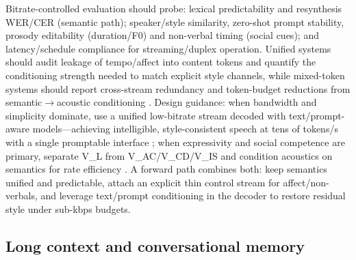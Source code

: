 \documentclass{article}
\begin{document}
Bitrate-controlled evaluation should probe: lexical predictability and resynthesis WER/CER (semantic path); speaker/style similarity, zero-shot prompt stability, prosody editability (duration/F0) and non-verbal timing (social cues); and latency/schedule compliance for streaming/duplex operation. Unified systems should audit leakage of tempo/affect into content tokens and quantify the conditioning strength needed to match explicit style channels, while mixed-token systems should report cross-stream redundancy and token-budget reductions from semantic$\rightarrow$acoustic conditioning \cite{yang2025diffsoundstreamefficientspeechtokenizati}. Design guidance: when bandwidth and simplicity dominate, use a unified low-bitrate stream decoded with text/prompt-aware models---achieving intelligible, style-consistent speech at tens of tokens/s with a single promptable interface \cite{zhang2024speechtokenizerunifiedspeechtokenizerlar,wang2025dualspeechlmtowardsunifiedspeechundersta,yang2025diffsoundstreamefficientspeechtokenizati,zhao2024textlessstreamingspeechtranslationsemant,jiang2025universalspeechtokenlearninglowbitratene}; when expressivity and social competence are primary, separate V_L from V_AC/V_CD/V_IS and condition acoustics on semantics for rate efficiency \cite{yang2025diffsoundstreamefficientspeechtokenizati,wang2025bossbeyondsemanticspeech}. A forward path combines both: keep semantics unified and predictable, attach an explicit thin control stream for affect/non-verbals, and leverage text/prompt conditioning in the decoder to restore residual style under sub-kbps budgets.

\subsection{Long context and conversational memory} \label{subsec:longcontextandconversationalmemory}
\end{document}
